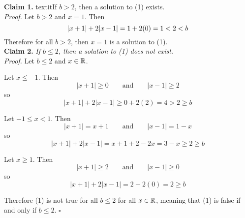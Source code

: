 \documentclass[../MATH137.tex]{subfiles}
\begin{document}
		\textbf{Claim 1.}  textit{If \(b > 2\), then a solution to (1) exists.} \\
			\textit{Proof.}
				Let \(b > 2\) and \(x = 1\). Then
					\[
						|x + 1| + 2|x - 1| = 1 + 2(0)
							= 1
							< 2 \\
							< b
					\]
				Therefore for all \(b > 2\), then \(x = 1\) is a solution to (1). \\
		\textbf{Claim 2.} \textit{If \(b \le 2\), then a solution to (1) does not exist.} \\
			\textit{Proof.}
				Let \(b \le 2\) and \(x \in \mathbb{R}\). \\
				\begin{description}[leftmargin = \widthof{Case 1: }]
					\item[\normalfont Case 1:] 
						Let \(x \le -1\). Then
							\[
								|x + 1| \ge 0 \qquad \text{and} \qquad
								|x - 1| \ge 2
							\]
						so
							\[
								|x + 1| + 2|x - 1| \ge 0 + 2(2)
									= 4
									> 2
									\ge b
							\]
					\item[\normalfont Case 2:]
						Let \(-1 \le x < 1\). Then
							\[
								|x + 1| = x + 1 \qquad \text{and} \qquad
									|x - 1| = 1 - x 
							\]
						so
							\[
								|x + 1| + 2|x - 1| = x + 1 + 2 - 2x
									= 3 - x
									\ge 2
									\ge b
							\]
					\item[\normalfont Case 3:]
						Let \(x \ge 1\). Then
							\[
								|x + 1| \ge 2 \qquad \text{and} \qquad
									|x - 1| \ge 0
							\]
						so
							\[
								|x + 1| + 2|x - 1| = 2 + 2(0)
									= 2
									\ge b
							\]
				\end{description}
				Therefore (1) is not true for all \(b \le 2\) for all \(x \in \mathbb{R}\), meaning that (1) is false if and only if \(b \le 2\). \(\square\)
\end{document}
